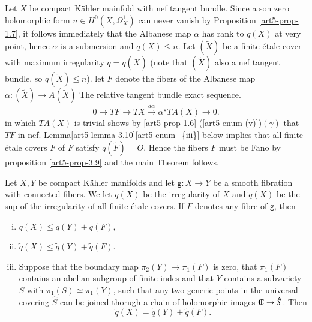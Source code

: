 \begin{proof of the main theorem*}
Let $X$ be compact K\"ahler mainfold with nef tangent bundle. Since a son zero holomorphic form $u \in H^{0}(X, \Omega_{X}^{1})$ can never vanish by Proposition \ref{art5-prop-1.7}, it follows immediately that the Albanese map $\alpha$ has rank to $q(X)$ at very point, hence $\alpha$ is a submersion and $q(X) \leq n$. Let $(\widetilde{X})$ be a finite
\'etale cover with maximum irregularity $q=q(\widetilde{X})$ (note that $(\widetilde{X})$ also a nef tangent bundle, so $q(\widetilde{X})\leq n$). let $F$ denote the fibers of the Albanese map $\alpha : (\widetilde{X}) \rightarrow A(\widetilde{X})$ The relative tangent bundle exact sequence. 
$$
0 \rightarrow TF \rightarrow TX \xrightarrow{d\alpha} \alpha^{\star}TA(X)\rightarrow 0.
$$
in which $TA(X)$ is trivial shows by \ref{art5-prop-1.6} (\ref{art5-enum-(v)})$(\gamma)$ that $TF$ in nef. Lemma\ref{art5-lemma-3.10}\ref{art5-enum_{iii}} below implies that all finite \'etale covers $\widetilde{F}$ of $F$ satisfy $q(\widetilde{F}) = O$. Hence the fibers $F$ must be Fano by proposition \ref{art5-prop-3.9} and the main Theorem follows.   
\end{proof of the main theorem*}

\begin{lem}\label{art5-lem-3.10}
Let $X, Y$ be compact K\"ahler manifolds and let $\mathsf{g}: X\rightarrow Y$ be a smooth fibration with connected fibers. We let $q(X)$ be the irregularity of $X$ and $\widetilde{q}(X)$ be the sup of the irregularity of all finite \'etale covers. If $F$ denotes any fibre of $\mathsf{g}$, then
 \begin{enumerate}[(i)]
 \item $q(X) \leq q(Y) + q(F)$,\label{art5-enum-lemma(3.10)_{i}}
 \item $\widetilde{q}(X) \leq \widetilde{q}(Y) + \widetilde{q}(F)$.\label{art5-enum-lemma(3.10)_{ii}}
 \item Suppose that the boundary map $\pi_{2}(Y) \rightarrow \pi_{1}(F)$ is zero, that $\pi_{1}(F)$ contains an abelian subgroup of finite indes and that $Y$ contains a subvariety $S$ with $\pi_{1}(S)\simeq \pi_{1}(Y)$, such that any two generic points in the universal covering $\hat{S}$ can be joined thorugh a chain of holomorphic images $\IC \rightarrow \hat{S}$. Then\label{art5-enum-lemma(3.10)_{iii}}
 $$
 \widetilde{q}(X) = \widetilde{q}(Y) + \widetilde{q}(F).
 $$ 
 \end{enumerate}
\end{lem}

